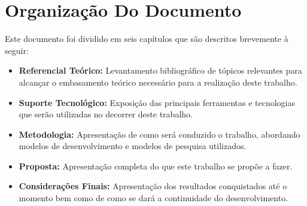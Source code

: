 \section{Organização Do Documento}

Este documento foi dividido em seis capítulos que são descritos brevemente à seguir:

\begin{itemize}
	\item \textbf{Referencial Teórico:} Levantamento bibliográfico de tópicos relevantes para alcançar o embasamento teórico necessário para a realização deste trabalho.
	\item \textbf{Suporte Tecnológico:} Exposição das principais ferramentas e tecnologias que serão utilizadas no decorrer deste trabalho.
	\item \textbf{Metodologia:} Apresentação de como será conduzido o trabalho, abordando modelos de desenvolvimento e modelos de pesquisa utilizados.
	\item \textbf{Proposta:} Apresentação completa do que este trabalho se propõe a fazer.
	\item \textbf{Considerações Finais:} Apresentação dos resultados conquistados até o momento bem como de como se dará a continuidade do desenvolvimento.
\end{itemize}
